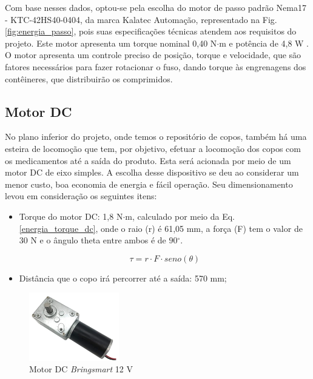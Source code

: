  Com base nesses dados, optou-se pela escolha do motor de passo padrão Nema17 - KTC-42HS40-0404, da marca Kalatec Automação, representado na Fig. \ref{fig:energia_passo}, pois suas especificações técnicas atendem aos requisitos do projeto. Este motor apresenta um torque nominal 0,40 N$\cdot$m e potência de 4,8 W . O motor apresenta um controle preciso de posição, torque e velocidade, que são fatores necessários para fazer rotacionar o fuso, dando torque às engrenagens dos contêineres, que distribuirão os comprimidos.
 
 
 \subsection{Motor DC}\label{energ:motor_dc}

No plano inferior do projeto, onde temos o repositório de copos, também há uma esteira de locomoção que tem, por objetivo, efetuar a locomoção dos copos com os medicamentos até a saída do produto. Esta será acionada por meio de um motor DC de eixo simples. A escolha desse dispositivo se deu ao considerar um menor custo, boa economia de energia e fácil operação. Seu dimensionamento levou em consideração os seguintes itens:

\begin{itemize}
    \item Torque do motor DC: 1,8 N$\cdot$m, calculado por meio da Eq. \ref{energia_torque_dc}, onde o raio (r) é 61,05 mm, a força (F) tem o valor de 30 N e o ângulo theta entre ambos é de $90${$^\circ$}.

    \begin{equation}
        \tau = r \cdot F \cdot seno(\theta)
        \label{energia_torque_dc}
    \end{equation}
    
    
    \item Distância que o copo irá percorrer até a saída: 570 mm;
\end{itemize}

\begin{figure}[H]
\centering
    \includegraphics[width=0.35\textwidth]{figuras/energia/fotos_componentes/Energia_dc.png}
    \caption{Motor DC \emph{Bringsmart} 12 V}
    \label{fig:energia_dc}
\end{figure}



